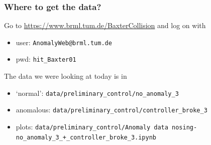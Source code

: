 \documentclass{beamer}
\begin{document}
    \begin{frame}
        \frametitle{Where to get the data?}
        Go to \url{https://www.brml.tum.de/BaxterCollision}
        and log on with
        \begin{itemize}
            \item user: \texttt{AnomalyWeb@brml.tum.de}
            \item pwd: \texttt{hit\_Baxter01}
        \end{itemize}
        \vspace{1cm}
        The data we were looking at today is in
        \begin{itemize}
            \item `normal': \texttt{data/preliminary\_control/no\_anomaly\_3}
            \item anomalous: \texttt{data/preliminary\_control/controller\_broke\_3}
            \item plots: \texttt{data/preliminary\_control/Anomaly data nosing-no\_anomaly\_3\_+\_controller\_broke\_3.ipynb} 
        \end{itemize}
    \end{frame}
\end{document}
